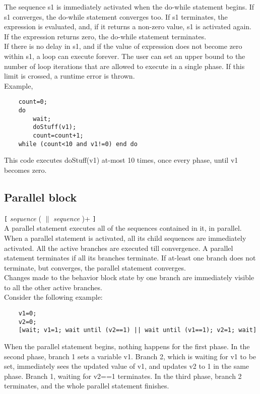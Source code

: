 	The sequence s1 is immediately activated when the do-while statement begins.
	If s1 converges, the do-while statement converges too. If s1 terminates, the expression is evaluated,
	and, if it returns a non-zero value, s1 is activated again. If the expression returns zero, 
	the do-while statement terminates.\\

	If there is no delay in s1, and if the value of expression does not become zero within s1,
	a loop can execute forever. The user can set an upper bound to the number of loop iterations
	that are allowed to execute in a single phase. If this limit is crossed, a runtime error is thrown.\\

	Example,

	\begin{verbatim}
	count=0;
	do
		wait;
		doStuff(v1);
		count=count+1;        
	while (count<10 and v1!=0) end do
	\end{verbatim}

	This code executes doStuff(v1) at-most 10 times, once every phase, 
	until v1 becomes zero.


	\subsection{Parallel block}
		\texttt{[} \textit{sequence} ( \texttt{$\parallel$} \textit{sequence} )+ \texttt{]}\\

	A parallel statement executes all of the sequences contained in it, in parallel.\\

	When a parallel statement is activated, all its child sequences are immediately activated.
	All the active branches are executed till convergence. 
	A parallel statement terminates if all its branches terminate.
	If at-least one branch does not terminate, but converges, 
	the parallel statement converges.\\

	Changes made to the behavior block state by one branch are immediately visible 
	to all the other active branches.\\

	Consider the following example:
	\begin{verbatim}
	v1=0;
	v2=0;
	[wait; v1=1; wait until (v2==1) || wait until (v1==1); v2=1; wait]
	\end{verbatim}

	When the parallel statement begins, nothing happens for the first phase.
	In the second phase, branch 1 sets a variable v1. 
	Branch 2, which is waiting for v1 to be set, 
	immediately sees the updated value of v1, 
	and updates v2 to 1 in the same phase. 
	Branch 1, waiting for v2==1 terminates.
	In the third phase, branch 2 terminates, 
	and the whole parallel statement finishes.
	
